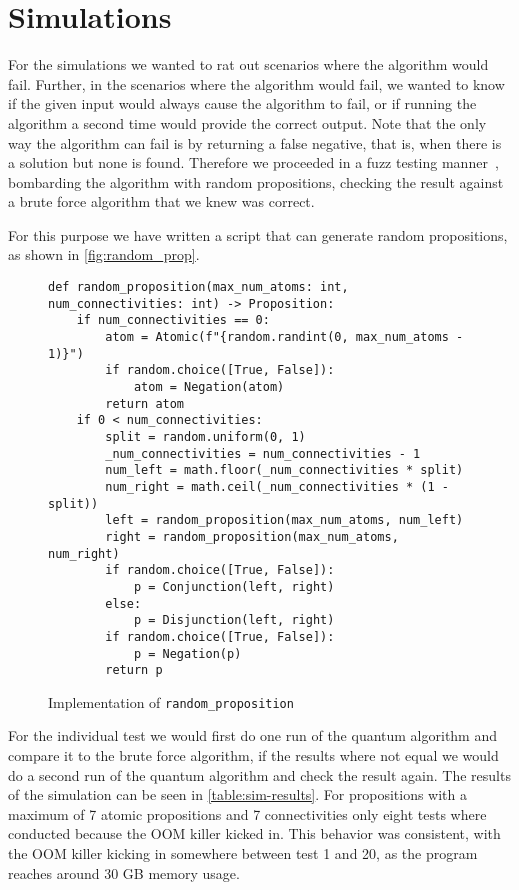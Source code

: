 \section{Simulations}\label{sec:simulations}

For the simulations we wanted to rat out scenarios where the algorithm would fail.
Further, in the scenarios where the algorithm would fail, we wanted to know if the given input would always cause the algorithm to fail, or if running the algorithm a second time would provide the correct output.
Note that the only way the algorithm can fail is by returning a false negative, that is, when there is a solution but none is found.
Therefore we proceeded in a fuzz testing manner~\cite{miller1990empirical}, bombarding the algorithm with random propositions, checking the result against a brute force algorithm that we knew was correct.

For this purpose we have written a script that can generate random propositions, as shown in \autoref{fig:random_prop}.

\begin{figure}[H]
\centering
\begin{verbatim}
def random_proposition(max_num_atoms: int, num_connectivities: int) -> Proposition:
    if num_connectivities == 0:
        atom = Atomic(f"{random.randint(0, max_num_atoms - 1)}")
        if random.choice([True, False]):
            atom = Negation(atom)
        return atom
    if 0 < num_connectivities:
        split = random.uniform(0, 1)
        _num_connectivities = num_connectivities - 1
        num_left = math.floor(_num_connectivities * split)
        num_right = math.ceil(_num_connectivities * (1 - split))
        left = random_proposition(max_num_atoms, num_left)
        right = random_proposition(max_num_atoms, num_right)
        if random.choice([True, False]):
            p = Conjunction(left, right)
        else:
            p = Disjunction(left, right)
        if random.choice([True, False]):
            p = Negation(p)
        return p
\end{verbatim}
\caption{Implementation of \texttt{random\_proposition} }
\label{fig:random_prop}
\end{figure}

For the individual test we would first do one run of the quantum algorithm and compare it to the brute force algorithm, if the results where not equal we would do a second run of the quantum algorithm and check the result again.
The results of the simulation can be seen in \autoref{table:sim-results}.
For propositions with a maximum of 7 atomic propositions and 7 connectivities only eight tests where conducted because the OOM killer kicked in.
This behavior was consistent, with the OOM killer kicking in somewhere between test 1 and 20, as the program reaches around 30 GB memory usage.

